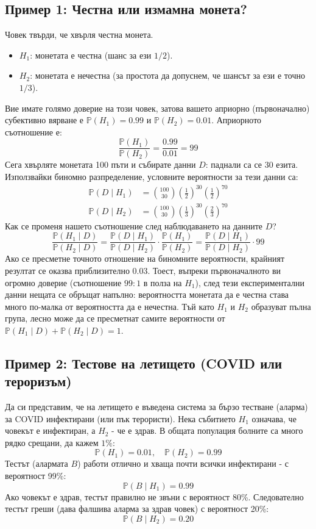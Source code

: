 \documentclass{article}
\begin{document}
\subsection{Пример 1: Честна или измамна монета?}

Човек твърди, че хвърля честна монета.
\begin{itemize}
    \item $H_1$: монетата е честна (шанс за ези $1/2$).
    \item $H_2$: монетата е нечестна (за простота да допуснем, че шансът за ези е точно $1/3$).
\end{itemize}
Вие имате голямо доверие на този човек, затова вашето априорно (първоначално) субективно вярване е $\mathbb{P}(H_1) = 0.99$ и $\mathbb{P}(H_2) = 0.01$. Априорното съотношение е:
\[
\frac{\mathbb{P}(H_1)}{\mathbb{P}(H_2)} = \frac{0.99}{0.01} = 99
\]
Сега хвърляте монетата 100 пъти и събирате данни $D$: паднали са се 30 езита. Използвайки биномно разпределение, условните вероятности за тези данни са:
\begin{align*}
\mathbb{P}(D \mid H_1) &= \binom{100}{30} \left(\frac{1}{2}\right)^{30} \left(\frac{1}{2}\right)^{70} \\
\mathbb{P}(D \mid H_2) &= \binom{100}{30} \left(\frac{1}{3}\right)^{30} \left(\frac{2}{3}\right)^{70}
\end{align*}
Как се променя нашето съотношение след наблюдаването на данните $D$?
\[
\frac{\mathbb{P}(H_1 \mid D)}{\mathbb{P}(H_2 \mid D)} = \frac{\mathbb{P}(D \mid H_1)}{\mathbb{P}(D \mid H_2)} \cdot \frac{\mathbb{P}(H_1)}{\mathbb{P}(H_2)} = \frac{\mathbb{P}(D \mid H_1)}{\mathbb{P}(D \mid H_2)} \cdot 99
\]
Ако се пресметне точното отношение на биномните вероятности, крайният резултат се оказва приблизително $0.03$. Тоест, въпреки първоначалното ви огромно доверие (съотношение $99:1$ в полза на $H_1$), след тези експериментални данни нещата се обръщат напълно: вероятността монетата да е честна става много по-малка от вероятността да е нечестна. Тъй като $H_1$ и $H_2$ образуват пълна група, лесно може да се пресметнат самите вероятности от $\mathbb{P}(H_1 \mid D) + \mathbb{P}(H_2 \mid D) = 1$.

\subsection{Пример 2: Тестове на летището (COVID или тероризъм)}

Да си представим, че на летището е въведена система за бързо тестване (аларма) за COVID инфектирани (или пък терористи). 
Нека събитието $H_1$ означава, че човекът е инфектиран, а $H_2$ - че е здрав.
В общата популация болните са много рядко срещани, да кажем $1\%$:
\[
\mathbb{P}(H_1) = 0.01, \quad \mathbb{P}(H_2) = 0.99
\]
Тестът (алармата $B$) работи отлично и хваща почти всички инфектирани - с вероятност 99\%:
\[
\mathbb{P}(B \mid H_1) = 0.99
\]
Ако човекът е здрав, тестът правилно не звъни с вероятност 80\%. Следователно тестът греши (дава фалшива аларма за здрав човек) с вероятност 20\%:
\[
\mathbb{P}(B \mid H_2) = 0.20
\]
\end{document}
